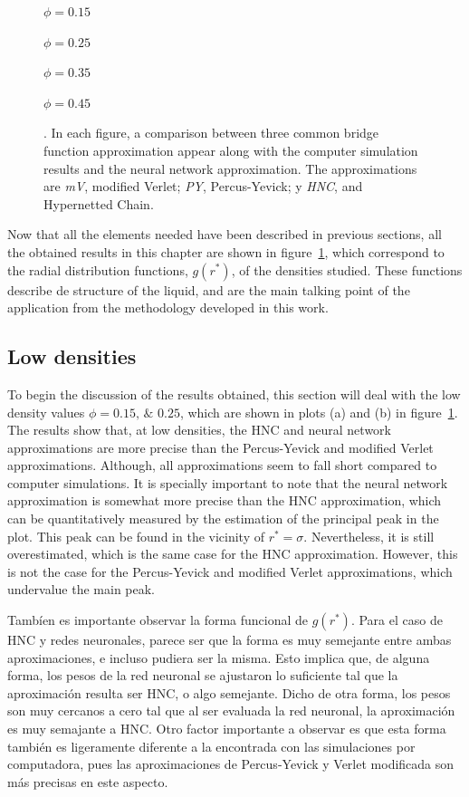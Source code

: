 \begin{figure}[p]
{    \begin{enumerate*}[label=(\alph*),itemjoin={,\enspace}]
        \item $\phi=\num{0.15}$
        \item $\phi=\num{0.25}$
        \item $\phi=\num{0.35}$
        \item $\phi=\num{0.45}$
    \end{enumerate*}
    . In each figure, a comparison between three common bridge function approximation appear along with the computer simulation results and the neural network approximation. The approximations are \emph{mV}, modified Verlet; \emph{PY}, Percus-Yevick; y \emph{HNC}, and Hypernetted Chain.}
    \label{fig:estructuras-neuronales}
\end{figure}

Now that all the elements needed have been described in previous sections, all the obtained
results in this chapter are shown in figure~\ref{fig:estructuras-neuronales}, which 
correspond to the radial distribution functions, $g(r^*)$, of the densities studied.
These functions describe de structure of the liquid, and are the main talking point of the
application from the methodology developed in this work.

\subsection{Low densities}
To begin the discussion of the results obtained, this section will deal with the low 
density values $\phi=\numlist{0.15; 0.25}$, which are shown in plots (a) and (b) in 
figure~\ref{fig:estructuras-neuronales}.
The results show that, at low densities, the HNC and neural network approximations are
more precise than the Percus-Yevick and modified Verlet approximations. Although, all
approximations seem to fall short compared to computer simulations. It is specially
important to note that the neural network approximation is somewhat more precise than
the HNC approximation, which can be quantitatively measured by the estimation of the
principal peak in the plot. This peak can be found in the vicinity of $r^* = \sigma$. 
Nevertheless, it is still overestimated, which is the same case for the HNC approximation.
However, this is not the case for the Percus-Yevick and modified Verlet approximations,
which undervalue the main peak.

Tambíen es importante observar la forma funcional de $g(r^*)$. Para el caso de HNC y redes 
neuronales, parece ser que la forma es muy semejante entre ambas aproximaciones, e incluso 
pudiera ser la misma. Esto implica que, de alguna forma, los pesos de la red neuronal se 
ajustaron lo suficiente tal que la aproximación resulta ser HNC, o algo semejante.
Dicho de otra forma, los pesos son muy cercanos a cero tal que al ser
evaluada la red neuronal, la aproximación es muy semajante a HNC.
Otro factor importante a observar es que esta forma también es ligeramente diferente a
la encontrada con las simulaciones por computadora, pues las aproximaciones de
Percus-Yevick y Verlet modificada son más precisas en este aspecto.

